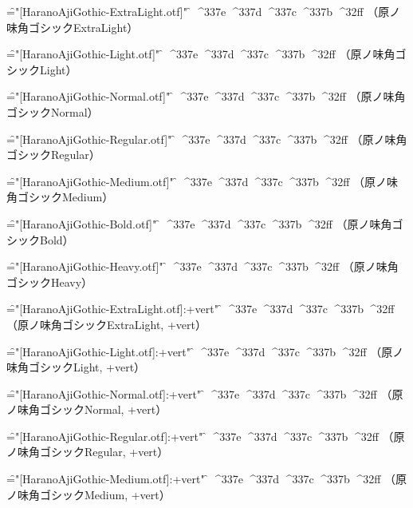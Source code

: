 
\nopagenumbers

\font\f="[HaranoAjiGothic-ExtraLight.otf]" \f
^^^^337e
^^^^337d
^^^^337c
^^^^337b
^^^^32ff
（原ノ味角ゴシックExtraLight）\par

\font\f="[HaranoAjiGothic-Light.otf]" \f
^^^^337e
^^^^337d
^^^^337c
^^^^337b
^^^^32ff
（原ノ味角ゴシックLight）\par

\font\f="[HaranoAjiGothic-Normal.otf]" \f
^^^^337e
^^^^337d
^^^^337c
^^^^337b
^^^^32ff
（原ノ味角ゴシックNormal）\par

\font\f="[HaranoAjiGothic-Regular.otf]" \f
^^^^337e
^^^^337d
^^^^337c
^^^^337b
^^^^32ff
（原ノ味角ゴシックRegular）\par

\font\f="[HaranoAjiGothic-Medium.otf]" \f
^^^^337e
^^^^337d
^^^^337c
^^^^337b
^^^^32ff
（原ノ味角ゴシックMedium）\par

\font\f="[HaranoAjiGothic-Bold.otf]" \f
^^^^337e
^^^^337d
^^^^337c
^^^^337b
^^^^32ff
（原ノ味角ゴシックBold）\par

\font\f="[HaranoAjiGothic-Heavy.otf]" \f
^^^^337e
^^^^337d
^^^^337c
^^^^337b
^^^^32ff
（原ノ味角ゴシックHeavy）\par


\font\f="[HaranoAjiGothic-ExtraLight.otf]:+vert" \f
^^^^337e
^^^^337d
^^^^337c
^^^^337b
^^^^32ff
（原ノ味角ゴシックExtraLight, +vert）\par

\font\f="[HaranoAjiGothic-Light.otf]:+vert" \f
^^^^337e
^^^^337d
^^^^337c
^^^^337b
^^^^32ff
（原ノ味角ゴシックLight, +vert）\par

\font\f="[HaranoAjiGothic-Normal.otf]:+vert" \f
^^^^337e
^^^^337d
^^^^337c
^^^^337b
^^^^32ff
（原ノ味角ゴシックNormal, +vert）\par

\font\f="[HaranoAjiGothic-Regular.otf]:+vert" \f
^^^^337e
^^^^337d
^^^^337c
^^^^337b
^^^^32ff
（原ノ味角ゴシックRegular, +vert）\par

\font\f="[HaranoAjiGothic-Medium.otf]:+vert" \f
^^^^337e
^^^^337d
^^^^337c
^^^^337b
^^^^32ff
（原ノ味角ゴシックMedium, +vert）\par

